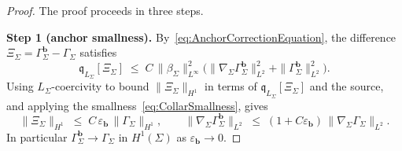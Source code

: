 \begin{proof}
The proof proceeds in three steps.

\textbf{Step 1 (anchor smallness).}
By~\eqref{eq:AnchorCorrectionEquation}, the difference $\Xi_\Sigma=\Gamma_\Sigma^{\mathbf b}-\Gamma_\Sigma$ satisfies
\[
    \mathfrak q_{L_\Sigma}[\Xi_\Sigma]\;\le\;C\,\|\beta_\Sigma\|_{L^\infty}^2\bigl(\|\nabla_\Sigma\Gamma_\Sigma^{\mathbf b}\|_{L^2}^2+\|\Gamma_\Sigma^{\mathbf b}\|_{L^2}^2\bigr).
\]
Using $L_\Sigma$-coercivity to bound $\|\Xi_\Sigma\|_{H^1}$ in terms of $\mathfrak q_{L_\Sigma}[\Xi_\Sigma]$ and the source, and applying the smallness~\eqref{eq:CollarSmallness}, gives
\begin{equation}\label{eq:AnchorSmallness}
    \|\Xi_\Sigma\|_{H^1}\;\le\;C\,\varepsilon_{\mathbf b}\,\|\Gamma_\Sigma\|_{H^1},
    \qquad
    \|\nabla_\Sigma\Gamma_\Sigma^{\mathbf b}\|_{L^2}\;\le\;(1+C\varepsilon_{\mathbf b})\,\|\nabla_\Sigma\Gamma_\Sigma\|_{L^2}.
\end{equation}
In particular $\Gamma_\Sigma^{\mathbf b}\to\Gamma_\Sigma$ in $H^1(\Sigma)$ as $\varepsilon_{\mathbf b}\to0$.


\end{proof}
